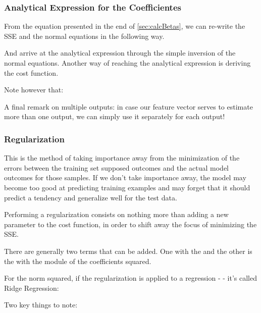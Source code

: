 \subsubsection{Analytical Expression for the Coefficientes}

From the equation presented in the end of \ref{sec:calcBetas}, we can re-write the SSE and the normal equations in the following way. 



And arrive at the analytical expression through the simple inversion of the normal equations. Another way of reaching the analytical expression is deriving the cost function.


Note however that:


A final remark on multiple outputs: in case our feature vector serves to estimate more than one output, we can simply use it separately for each output!


\subsubsection{Regularization}

This is the method of taking importance away from the minimization of the errors between the training set supposed outcomes and the actual model outcomes for those samples. If we don't take importance away, the model may become too good at predicting training examples and may forget that it should predict a tendency and generalize well for the test data.


Performing a regularization consists on nothing more than adding a new parameter to the cost function, in order to shift away the focus of minimizing the SSE.

There are generally two terms that can be added. One with the  and the other is the with the module of the coefficients squared.

For the norm squared, if the regularization is applied to a regression -  - it's called Ridge Regression:



Two key things to note:

